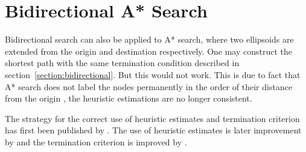 \begin{comment}
\subsection{Linear Programming Perspective}
\todo[inline]{incomplete}
A* search can be describe in a linear programming perspective.
The reduced cost is $c_{ij} - y_j +y_i$ where $y_j$ and $y_i$ are the dual variables for $(i,j) \in E$, 
essentially A* search puts weight on the edges to and select  out the path with the maximum reduces cost, the weight is the heuristic values.
\begin{alignat}{2}
    \text{Primal: Minimise}   & \quad \sum_{(i, j)\in E} c_{ij} x_{ij} \\
    \text{Subject to} & \quad \sum_j x_{ij} - \sum_j x_{ji} = 0 \quad \forall i\\
    & \quad \sum_j x_{sj} - \sum_j x_{js} = 1 \\
    & \quad \sum_j x_{tj} - \sum_j x_{jt} = -1 \\
    & \quad x_{ij} = \{0,1\} \quad \forall (i,j) \in E
\end{alignat}

\begin{alignat}{2}
    \text{Dual: Maximise} & \quad y_t - y_s \\
    \text{Subject to} & \quad y_j - y_i \leq c_{ij} \quad \forall (i,j) \in E \\
    \text{where} & \quad y_{\cdot} = \sum_j x_{\cdot j} - \sum_j x_{j\cdot}  
\end{alignat}
\end{comment}

\section{Bidirectional A* Search}
Bidirectional search can also be applied to A* search,
where two ellipsoids are extended from the origin and destination respectively.
One may construct the shortest path with the same termination condition described in section~\ref{section:bidirectional}.
But this would not work.
This is due to fact that A* search does not label the nodes permanently in the order of their distance from the origin \citep{Klunder},
the heuristic estimations are no longer consistent.

The strategy for the correct use of heuristic estimates and termination criterion has first been published by \citet{Pohl}. The use of heuristic estimates is later improvement by \citet{Ikeda} and the termination criterion is improved by \citet{GoldbergEPP}.

